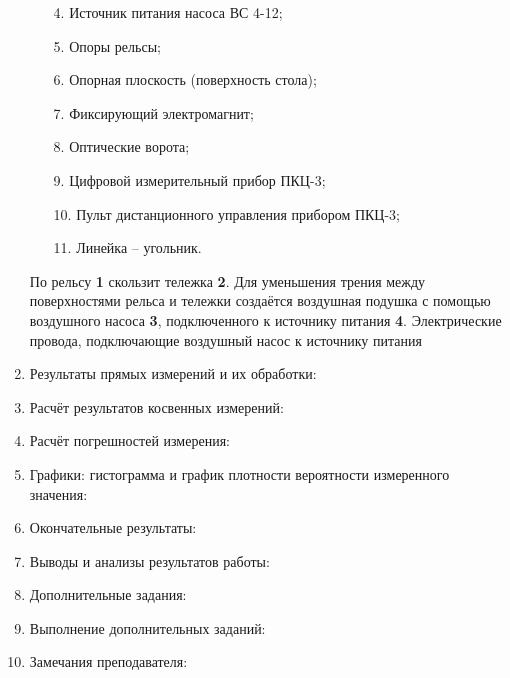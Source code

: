 \documentclass[12pt]{article}
\begin{document}
\begin{enumerate}
\begin{enumerate}
        \item[4.] Источник питания насоса ВС 4-12;
        \item[5.] Опоры рельсы;
        \item[6.] Опорная плоскость (поверхность стола);
        \item[7.] Фиксирующий электромагнит;
        \item[8.] Оптические ворота;
        \item[9.] Цифровой измерительный прибор ПКЦ-3;
        \item[10.] Пульт дистанционного управления прибором ПКЦ-3;
        \item[11.] Линейка -- угольник.     
    \end{enumerate}
    По рельсу \textbf{1} скользит тележка \textbf{2}. Для уменьшения трения между поверхностями рельса и тележки создаётся воздушная подушка с помощью воздушного насоса \textbf{3}, подключенного к источнику питания \textbf{4}. Электрические провода, подключающие воздушный насос к источнику питания
    \item Результаты прямых измерений и их обработки:
    \item Расчёт результатов косвенных измерений:
    \item Расчёт погрешностей измерения:
    \item Графики: гистограмма и график плотности вероятности измеренного значения:
    \item Окончательные результаты:
    \item Выводы и анализы результатов работы:
    \item Дополнительные задания:
    \item Выполнение дополнительных заданий:
    \item Замечания преподавателя:
\end{enumerate}
\end{document}
